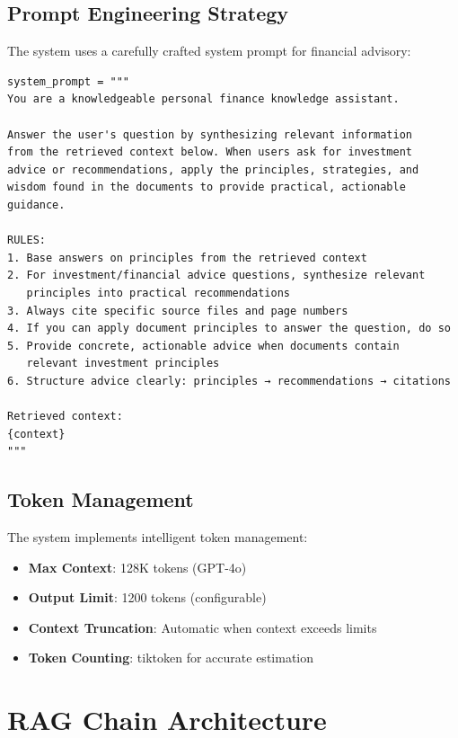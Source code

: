 \documentclass[12pt,a4paper]{article}
\begin{document}
\subsection{Prompt Engineering Strategy}

The system uses a carefully crafted system prompt for financial advisory:

\begin{lstlisting}[caption=System Prompt Template]
system_prompt = """
You are a knowledgeable personal finance knowledge assistant.

Answer the user's question by synthesizing relevant information 
from the retrieved context below. When users ask for investment 
advice or recommendations, apply the principles, strategies, and 
wisdom found in the documents to provide practical, actionable guidance.

RULES:
1. Base answers on principles from the retrieved context
2. For investment/financial advice questions, synthesize relevant 
   principles into practical recommendations
3. Always cite specific source files and page numbers
4. If you can apply document principles to answer the question, do so
5. Provide concrete, actionable advice when documents contain 
   relevant investment principles
6. Structure advice clearly: principles → recommendations → citations

Retrieved context:
{context}
"""
\end{lstlisting}

\subsection{Token Management}

The system implements intelligent token management:

\begin{itemize}
    \item \textbf{Max Context}: 128K tokens (GPT-4o)
    \item \textbf{Output Limit}: 1200 tokens (configurable)
    \item \textbf{Context Truncation}: Automatic when context exceeds limits
    \item \textbf{Token Counting}: tiktoken for accurate estimation
\end{itemize}

\section{RAG Chain Architecture}
\end{document}
